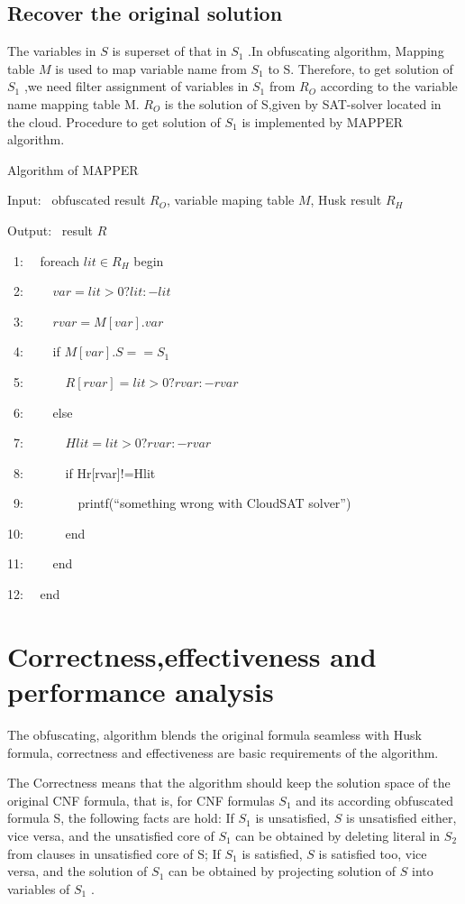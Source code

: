 \documentclass[runningheads,a4paper]{llncs}
\begin{document}
\subsection{Recover the original solution}

The variables in $S$ is superset of that in $S_1$ .In obfuscating algorithm, Mapping table $M$ is used to map variable name from $S_1$  to S. 
Therefore, to get solution of $S_1$  ,we need filter assignment of variables in $S_1$  from  $R_O$  according to the variable name mapping table M.  
$R_O$  is the solution of S,given by SAT-solver located in the cloud. Procedure to get solution of $S_1$  is implemented by MAPPER algorithm.

\noindent Algorithm of MAPPER

Input:~ obfuscated result $R_O$, variable maping table $M$, Husk result $R_H$

Output:~ result $R$

~1:~~ foreach $lit \in R_H$ begin

~2:~~~~   $var=lit>0?lit:-lit$

~3:~~~~   $rvar=M[var].var$

~4:~~~~   if $M[var].S==S_1$

~5:~~~~~~       $R[rvar]=lit>0?rvar:-rvar$ 

~6:~~~~   else    

~7:~~~~~~       $Hlit=lit>0?rvar:-rvar$

~8:~~~~~~       if Hr[rvar]!=Hlit

~9:~~~~~~~~       printf(“something wrong with CloudSAT solver”)

10:~~~~~~       end

11:~~~~   end

12:~~  end

\section{Correctness,effectiveness and performance analysis}

The obfuscating, algorithm blends the original formula seamless with Husk formula, correctness and effectiveness are basic requirements of the algorithm. 

The Correctness means that the algorithm should keep the solution space of the original CNF formula, that is, for CNF formulas $S_1$  and its according obfuscated formula S, 
the following facts are hold: If $S_1$  is unsatisfied, $S$ is unsatisfied either, vice versa, and the unsatisfied core of $S_1$  can be obtained by deleting literal in $S_2$  from clauses in unsatisfied core of S;
If $S_1$  is satisfied, $S$ is satisfied too, vice versa, and the solution of $S_1$  can be obtained by projecting solution of $S$ into variables of $S_1$ . 
\end{document}
